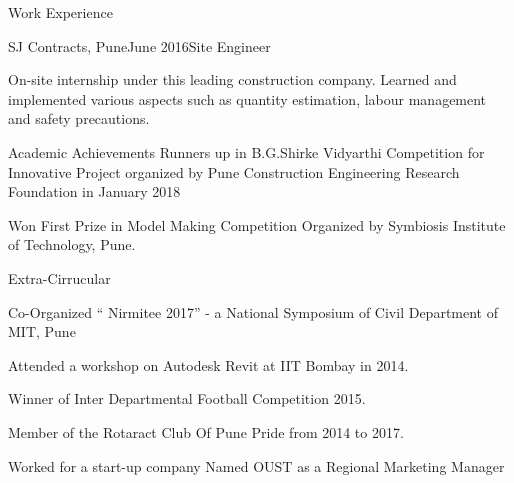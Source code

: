 \documentclass{resume} %
\begin{document}
\begin{rSection}{Work Experience}

\begin{rSubsection}{SJ Contracts, Pune}{June 2016}{Site Engineer}{}
\item On-site internship under this leading construction company. Learned and implemented various aspects such as quantity estimation, labour management and safety precautions.
\end{rSubsection}


\end{rSection}



\begin{rSection}{Academic Achievements} 
 Runners up in B.G.Shirke Vidyarthi Competition for Innovative Project organized by Pune Construction Engineering Research Foundation in January 2018
\item Won First Prize in Model Making Competition Organized by Symbiosis Institute of Technology, Pune.
\end{rSection}

\begin{rSection}{Extra-Cirrucular} \itemsep -3pt
\item Co-Organized “ Nirmitee 2017” - a National Symposium of Civil Department of MIT, Pune
\item Attended a workshop on Autodesk Revit at IIT Bombay in 2014.
\item Winner of Inter Departmental Football Competition 2015.
\item Member of the  Rotaract Club Of Pune Pride from 2014 to 2017.
\item Worked for a start-up company Named OUST as a Regional Marketing Manager

\end{rSection}
\end{document}

